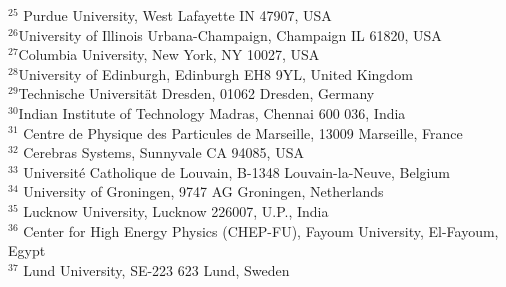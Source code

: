 {$^{25}$ Purdue University, West Lafayette IN 47907, USA\\
$^{26}$University of Illinois Urbana-Champaign, Champaign IL 61820, USA\\
$^{27}$Columbia University, New York, NY 10027, USA\\
$^{28}$University of Edinburgh, Edinburgh EH8 9YL, United Kingdom \\
$^{29}$Technische Universit\"{a}t Dresden, 01062 Dresden, Germany\\
$^{30}$Indian Institute of Technology Madras, Chennai 600 036, India\\
$^{31}$ Centre de Physique des Particules de Marseille, 13009 Marseille, France\\
$^{32}$ Cerebras Systems, Sunnyvale CA 94085, USA \\
$^{33}$ Universit\'{e} Catholique de Louvain, B-1348 Louvain-la-Neuve, Belgium\\
$^{34}$ University of Groningen, 9747 AG Groningen, Netherlands\\
$^{35}$ Lucknow University, Lucknow 226007, U.P., India\\
$^{36}$ Center for High Energy Physics (CHEP-FU), Fayoum University, El-Fayoum, Egypt \\
$^{37}$ Lund University, SE-223 623 Lund, Sweden
} 

\def\corrAuthor{Allison McCarn Deiana, Nhan Tran}
\def\corrEmail{adeiana@smu.edu, ntran@fnal.gov}